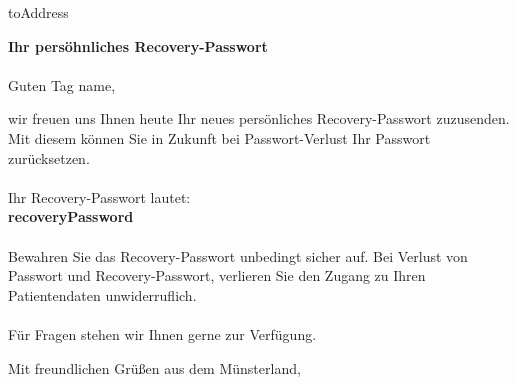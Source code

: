 \documentclass[11pt]{dinbrief}
\begin{document}
\centeraddress
{}
\signature{Ihr Nibyou Team}
\date{\today}
\begin{letter}{ {{toAddress}} }
  \nowindowrules
  \nowindowtics
\opening{ {\Large \textbf{Ihr persöhnliches Recovery-Passwort} } \\ \ \\Guten Tag {{name}},}
wir freuen uns Ihnen heute Ihr neues persönliches Recovery-Passwort zuzusenden. Mit diesem können Sie in Zukunft bei Passwort-Verlust Ihr Passwort zurücksetzen. \\ \ \\
Ihr Recovery-Passwort lautet:\\
\textbf{ {{recoveryPassword}} }
\\ \ \\
Bewahren Sie das Recovery-Passwort unbedingt sicher auf. Bei Verlust von Passwort und Recovery-Passwort, verlieren Sie den Zugang zu Ihren Patientendaten unwiderruflich. \\ \ \\
Für Fragen stehen wir Ihnen gerne zur Verfügung.
\closing[]{Mit freundlichen Grüßen aus dem Münsterland,}
\end{letter}
\end{document}
